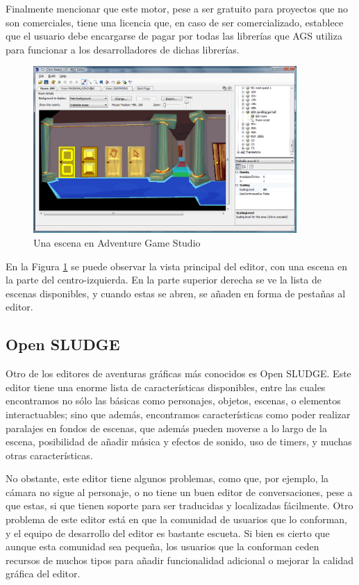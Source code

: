Finalmente mencionar que este motor, pese a ser gratuito para proyectos que no son comerciales, tiene una licencia que, en caso de ser comercializado, establece que el usuario debe encargarse de pagar por todas las librerías que AGS utiliza para funcionar a los desarrolladores de dichas librerías.

\begin{figure}[htb]
	\centerline{\includegraphics[height=2.5in]{figures/ags.png}}
	\caption[Adventure Game Studio]{Una escena en Adventure Game Studio}
	\label{agsfigure}
\end{figure}

En la Figura \ref{agsfigure} se puede observar la vista principal del editor, con una escena en la parte del centro-izquierda. En la parte superior derecha se ve la lista de escenas disponibles, y cuando estas se abren, se añaden en forma de pestañas al editor.

\subsection{Open SLUDGE}
\label{opensludge}

Otro de los editores de aventuras gráficas más conocidos es Open SLUDGE. Este editor tiene una enorme lista de características disponibles, entre las cuales encontramos no sólo las básicas como personajes, objetos, escenas, o elementos interactuables; sino que además, encontramos características como poder realizar paralajes en fondos de escenas, que además pueden moverse a lo largo de la escena, posibilidad de añadir música y efectos de sonido, uso de timers, y muchas otras características.

No obstante, este editor tiene algunos problemas, como que, por ejemplo, la cámara no sigue al personaje, o no tiene un buen editor de conversaciones, pese a que estas, si que tienen soporte para ser traducidas y localizadas fácilmente. Otro problema de este editor está en que la comunidad de usuarios que lo conforman, y el equipo de desarrollo del editor es bastante escueta. Si bien es cierto que aunque esta comunidad sea pequeña, los usuarios que la conforman ceden recursos de muchos tipos para añadir funcionalidad adicional o mejorar la calidad gráfica del editor.

